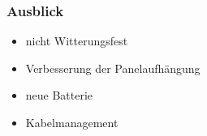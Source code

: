 \documentclass{beamer}
\begin{document}
\begin{frame}
	\frametitle{Ausblick}	
	\begin{itemize}
		\item nicht Witterungsfest
		\item Verbesserung der Panelaufhängung
		\item neue Batterie
		\item Kabelmanagement
	\end{itemize}

\end{frame}




\end{document}
